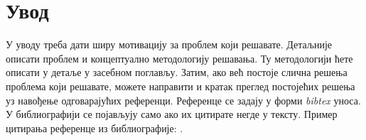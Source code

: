 \section{Увод}
У уводу треба дати ширу мотивацију за проблем који решавате. Детаљније описати проблем и концептуално методологију решавања. Ту методологији ћете описати у детаље у засебном поглављу. Затим, ако већ постоје слична решења проблема који решавате, можете направити и кратак преглед постојећих решења уз навођење одговарајућих референци. Референце се задају у форми \textit{bibtex} уноса. У библиографији се појављују само ако их цитирате негде у тексту. Пример цитирања референце из библиографије: \cite{bibtex}.